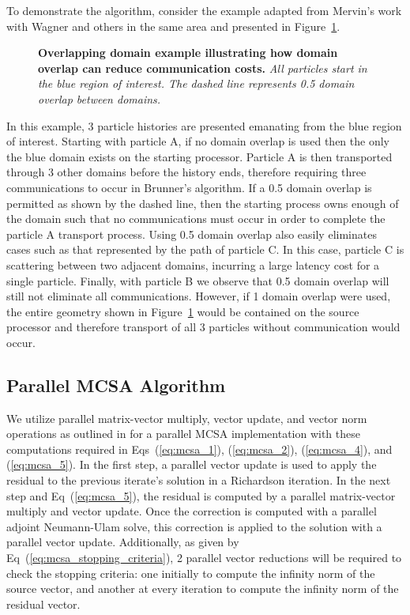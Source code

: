 \documentclass{snamc2013}
\begin{document}
To demonstrate the algorithm, consider the example adapted from
Mervin's work with Wagner and others in the same area
\cite{mervin_variance_2012} and presented in
Figure~\ref{fig:msod_example}.
\begin{figure}[h!]
  \begin{center}
    \scalebox{0.8}{  }
  \end{center}
  \caption{\textbf{Overlapping domain example illustrating how domain
      overlap can reduce communication costs.}
    \textit{All particles start in the blue region of interest. The
      dashed line represents 0.5 domain overlap between domains.}}
  \label{fig:msod_example}
\end{figure}
In this example, 3 particle histories are presented emanating from the
blue region of interest. Starting with particle A, if no domain
overlap is used then the only the blue domain exists on the starting
processor. Particle A is then transported through 3 other domains
before the history ends, therefore requiring three communications to
occur in Brunner's algorithm. If a 0.5 domain overlap is permitted as
shown by the dashed line, then the starting process owns enough of the
domain such that no communications must occur in order to complete the
particle A transport process. Using 0.5 domain overlap also easily
eliminates cases such as that represented by the path of particle
C. In this case, particle C is scattering between two adjacent
domains, incurring a large latency cost for a single
particle. Finally, with particle B we observe that 0.5 domain overlap
will still not eliminate all communications. However, if 1 domain
overlap were used, the entire geometry shown in
Figure~\ref{fig:msod_example} would be contained on the source
processor and therefore transport of all 3 particles without
communication would occur.

\subsection{Parallel MCSA Algorithm}
We utilize parallel matrix-vector multiply, vector update, and vector
norm operations as outlined in \cite{saad_iterative_2003} for a
parallel MCSA implementation with these computations required in
Eqs~(\ref{eq:mcsa_1}), (\ref{eq:mcsa_2}), (\ref{eq:mcsa_4}), and
(\ref{eq:mcsa_5}). In the first step, a parallel vector update is used
to apply the residual to the previous iterate's solution in a
Richardson iteration. In the next step and Eq~(\ref{eq:mcsa_5}), the
residual is computed by a parallel matrix-vector multiply and vector
update. Once the correction is computed with a parallel adjoint
Neumann-Ulam solve, this correction is applied to the solution with a
parallel vector update. Additionally, as given by
Eq~(\ref{eq:mcsa_stopping_criteria}), 2 parallel vector reductions
will be required to check the stopping criteria: one initially to
compute the infinity norm of the source vector, and another at every
iteration to compute the infinity norm of the residual vector.
\end{document}
